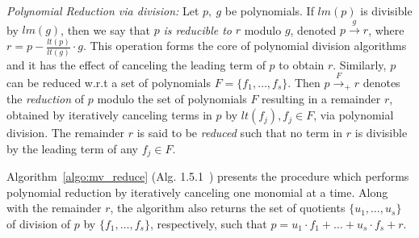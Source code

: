 
{\it Polynomial Reduction via division:} 
Let $p,~g$ be polynomials. If
$lm(p)$ is divisible by $lm(g)$, then we say that $p$ {\it is
reducible to} $r$ modulo $g$, denoted $p
\stackrel{g}{\textstyle\longrightarrow} r$, where $r = p - \frac{lt(p)}{lt(g)} 
\cdot g$. This operation forms the core  of polynomial
division algorithms and it has the effect of canceling the 
leading term of $p$ to obtain $r$. Similarly, 
$p$ can be reduced w.r.t a set of polynomials $F=\{f_1,\dots,f_s\}$. 
Then $p\xrightarrow{F}_+r$ denotes the {\it
  reduction} of $p$ modulo the set of polynomials $F$ resulting in a
remainder $r$, obtained by iteratively canceling terms in $p$ by
$lt(f_j), f_j\in F$, via polynomial division. 
 The remainder $r$ is said to be {\it reduced} such that no term in $r$ is
divisible by the leading term of any $f_j \in F$.

Algorithm~\ref{algo:mv_reduce} (Alg.
1.5.1~\cite{gb_book}) presents the procedure which
performs polynomial reduction by iteratively canceling
one monomial at a time.
Along with the remainder $r$, the algorithm also returns
the set of quotients $\{u_1,\dots,u_s\}$ of division of $p$ by
$\{f_1,\dots,f_s\}$, respectively, such that $p = u_1\cdot
f_1+\dots+u_s\cdot f_s + r$.

